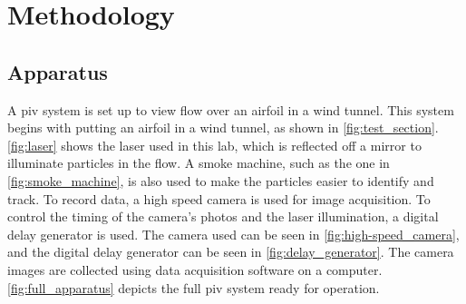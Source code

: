 \chapter{Methodology}
\label{cp:methodology}
\section{Apparatus} \label{sec:Apparatus}
A \acrshort{piv} system is set up to view flow over an airfoil in a wind tunnel. This system begins with putting an airfoil in a wind tunnel, as shown in \autoref{fig:test_section}. \autoref{fig:laser} shows the laser used in this lab, which is reflected off a mirror to illuminate particles in the flow. A smoke machine, such as the one in \autoref{fig:smoke_machine}, is also used to make the particles easier to identify and track. To record data, a high speed camera is used for image acquisition. To control the timing of the camera's photos and the laser illumination, a digital delay generator is used. The camera used can be seen in \autoref{fig:high-speed_camera}, and the digital delay generator can be seen in \autoref{fig:delay_generator}. The camera images are collected using data acquisition software on a computer. \autoref{fig:full_apparatus} depicts the full \acrshort{piv} system ready for operation.

